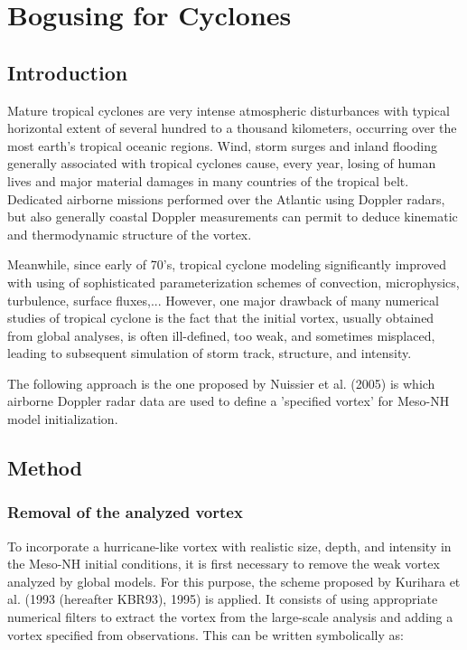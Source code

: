 
\chapter{Bogusing for Cyclones}

\minitoc
\section{Introduction}
Mature tropical cyclones are very intense atmospheric disturbances with 
typical horizontal extent of several hundred to a thousand kilometers, 
occurring over the most earth's tropical oceanic regions. Wind, storm surges 
and inland flooding generally associated with tropical cyclones cause, 
every year, losing of human lives and major material damages in many 
countries of the tropical belt. Dedicated airborne missions performed over 
the Atlantic using Doppler radars, but also generally coastal Doppler 
measurements can permit to deduce kinematic and thermodynamic structure of 
the vortex. 

Meanwhile, since early of 70's, tropical cyclone modeling significantly 
improved with using of sophisticated parameterization schemes of convection, 
microphysics, turbulence, surface fluxes,... However, one major drawback of many 
numerical studies of tropical cyclone is the fact that the initial vortex, 
usually obtained from global analyses, is often ill-defined, too weak, and 
sometimes misplaced, leading to subsequent simulation of storm track, structure, 
and intensity.

The following approach is the one proposed by Nuissier et al. (2005) is which 
airborne Doppler radar data are used to define a 'specified vortex' for Meso-NH
model initialization.

\section{Method}


\subsection{Removal of the analyzed vortex}

To incorporate a hurricane-like vortex with realistic size, depth, and intensity 
in the Meso-NH initial conditions, it is first necessary to remove the weak 
vortex analyzed by global models. For this purpose, the scheme proposed by 
Kurihara et al. (1993 (hereafter KBR93), 1995) is applied.
It consists of using appropriate numerical  filters to extract the vortex
from the large-scale analysis and adding a vortex specified from observations.
This can be written symbolically as:

